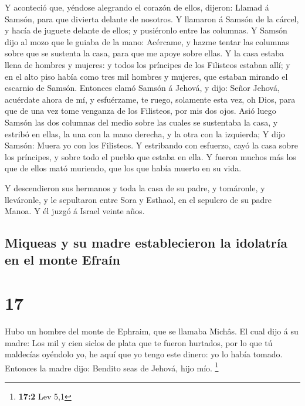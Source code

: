  Y aconteció que, yéndose alegrando el corazón de ellos,
dijeron: Llamad á Samsón, para que divierta delante de nosotros. Y
llamaron á Samsón de la cárcel, y hacía de juguete delante de ellos; y
pusiéronlo entre las columnas.  Y Samsón dijo al mozo que
le guiaba de la mano: Acércame, y hazme tentar las columnas sobre que se
sustenta la casa, para que me apoye sobre ellas.  Y la
casa estaba llena de hombres y mujeres: y todos los príncipes de los
Filisteos estaban allí; y en el alto piso había como tres mil hombres y
mujeres, que estaban mirando el escarnio de Samsón. 
Entonces clamó Samsón á Jehová, y dijo: Señor Jehová, acuérdate ahora de
mí, y esfuérzame, te ruego, solamente esta vez, oh Dios, para que de una
vez tome venganza de los Filisteos, por mis dos ojos. 
Asió luego Samsón las dos columnas del medio sobre las cuales se
sustentaba la casa, y estribó en ellas, la una con la mano derecha, y la
otra con la izquierda;  Y dijo Samsón: Muera yo con los
Filisteos. Y estribando con esfuerzo, cayó la casa sobre los príncipes,
y sobre todo el pueblo que estaba en ella. Y fueron muchos más los que
de ellos mató muriendo, que los que había muerto en su vida.

 Y descendieron sus hermanos y toda la casa de su padre,
y tomáronle, y lleváronle, y le sepultaron entre Sora y Esthaol, en el
sepulcro de su padre Manoa. Y él juzgó á Israel veinte años.

\hypertarget{miqueas-y-su-madre-establecieron-la-idolatruxeda-en-el-monte-efrauxedn}{%
\subsection{Miqueas y su madre establecieron la idolatría en el monte
Efraín}\label{miqueas-y-su-madre-establecieron-la-idolatruxeda-en-el-monte-efrauxedn}}

\hypertarget{section-16}{%
\section{17}\label{section-16}}

 Hubo un hombre del monte de Ephraim, que se llamaba
Michâs.  El cual dijo á su madre: Los mil y cien siclos de
plata que te fueron hurtados, por lo que tú maldecías oyéndolo yo, he
aquí que yo tengo este dinero: yo lo había tomado. Entonces la madre
dijo: Bendito seas de Jehová, hijo mío. \footnote{\textbf{17:2} Lev 5,1}

